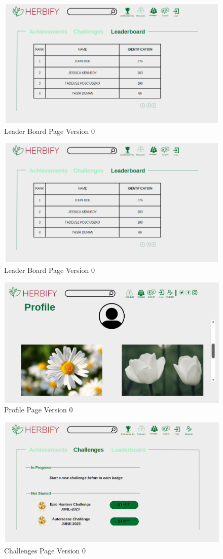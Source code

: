 \documentclass[conference]{IEEEtran}
\begin{document}
\begin{figure}[H]
\centerline{\includegraphics[width=0.48 \textwidth]{images/leaderboardv0.png}}
\caption{Leader Board Page Version 0}
\label{fig:graph1}
\end{figure}


\begin{figure}[H]
\centerline{\includegraphics[width=0.48 \textwidth]{images/leaderboardv0.png}}
\caption{Leader Board Page Version 0}
\label{fig:graph1}
\end{figure}

\begin{figure}[H]
\centerline{\includegraphics[width=0.48 \textwidth]{images/profilev0.png}}
\caption{Profile Page Version 0}
\label{fig:graph1}
\end{figure}

\begin{figure}[H]
\centerline{\includegraphics[width=0.48 \textwidth]{images/challengesv0.png}}
\caption{Challenges Page Version 0}
\label{fig:graph1}
\end{figure}
\end{document}
